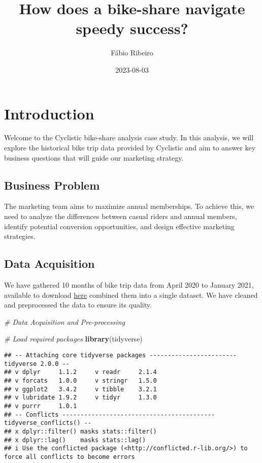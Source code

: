 \documentclass[
]{article}
\title{How does a bike-share navigate speedy success?}
\author{Fábio Ribeiro}
\date{2023-08-03}
\newenvironment{Shaded}{\begin{snugshade}}{\end{snugshade}}
\newcommand{\CommentTok}[1]{\textcolor[rgb]{0.56,0.35,0.01}{\textit{#1}}}
\newcommand{\FunctionTok}[1]{\textcolor[rgb]{0.13,0.29,0.53}{\textbf{#1}}}
\newcommand{\NormalTok}[1]{#1}
\begin{document}
\maketitle

\hypertarget{introduction}{%
\section{Introduction}\label{introduction}}

Welcome to the Cyclistic bike-share analysis case study. In this
analysis, we will explore the historical bike trip data provided by
Cyclistic and aim to answer key business questions that will guide our
marketing strategy.

\hypertarget{business-problem}{%
\subsection{Business Problem}\label{business-problem}}

The marketing team aims to maximize annual memberships. To achieve this,
we need to analyze the differences between casual riders and annual
members, identify potential conversion opportunities, and design
effective marketing strategies.

\hypertarget{data-acquisition}{%
\subsection{Data Acquisition}\label{data-acquisition}}

We have gathered 10 months of bike trip data from April 2020 to January
2021, available to download
\href{https://divvy-tripdata.s3.amazonaws.com/index.html}{here} combined
them into a single dataset. We have cleaned and preprocessed the data to
ensure its quality.

\begin{Shaded}
\begin{Highlighting}[]
\CommentTok{\# Data Acquisition and Pre{-}processing}

\CommentTok{\# Load required packages}
\FunctionTok{library}\NormalTok{(tidyverse)}
\end{Highlighting}
\end{Shaded}

\begin{verbatim}
## -- Attaching core tidyverse packages ------------------------ tidyverse 2.0.0 --
## v dplyr     1.1.2     v readr     2.1.4
## v forcats   1.0.0     v stringr   1.5.0
## v ggplot2   3.4.2     v tibble    3.2.1
## v lubridate 1.9.2     v tidyr     1.3.0
## v purrr     1.0.1     
## -- Conflicts ------------------------------------------ tidyverse_conflicts() --
## x dplyr::filter() masks stats::filter()
## x dplyr::lag()    masks stats::lag()
## i Use the conflicted package (<http://conflicted.r-lib.org/>) to force all conflicts to become errors
\end{verbatim}
\end{document}
